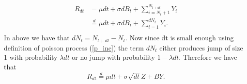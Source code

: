 \documentclass[12pt]{report}
\begin{document}
\begin{equation}
\begin{aligned}
    R_{dt} &= \mu dt + \sigma dB_{t} + \sum_{i=N_t + 1}^{N_{t+dt}} Y_i\\
    & \stackrel{d}{=} \mu dt + \sigma dB_{t} + \sum_{i=1}^{dN_t} Y_i.\\
\end{aligned}
\label{approx_returns}    
\end{equation}
In above we have that $dN_t = N_{t+dt} - N_t $. Now since dt is small enough using definition of  poisson process (\ref{p_inc}) the term $dN_t$ either produces jump of size 1 with probability $\lambda dt$ or no jump with probability $1 - \lambda dt$. Therefore we have that 
\begin{equation}
 R_{dt} \stackrel{d}{=} \mu dt + \sigma \sqrt{dt}Z + BY.   
\end{equation}
\end{document}
